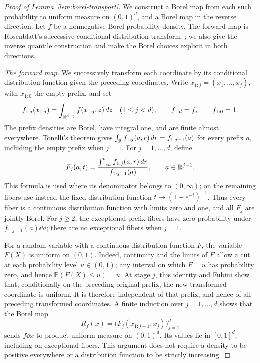 \begin{proof}[Proof of Lemma~\ref{lem:borel-transport}]
We construct a Borel map from each such probability to uniform measure
on \((0,1)^d\), and a Borel map in the reverse direction. Let \(f\) be a
nonnegative Borel probability density. The forward map is Rosenblatt's
successive conditional-distribution transform~\cite{Rosenblatt1952}; we
also give the inverse quantile construction and make the Borel choices
explicit in both directions.

\emph{The forward map.}
We successively transform each coordinate by its conditional distribution
function given the preceding coordinates. Write
\(x_{1:j}=(x_1,\ldots,x_j)\), with \(x_{1:0}\) the empty prefix, and set
\[
 f_{1:j}(x_{1:j})=\int_{\mathbb R^{d-j}}f(x_{1:j},z)\,d z
 \quad(1\le j<d),\qquad f_{1:d}=f,\qquad f_{1:0}=1.
\]
The prefix densities are Borel, have integral one, and are finite almost
everywhere. Tonelli's theorem gives
\(\int_\mathbb R f_{1:j}(a,r)\,d r=f_{1:j-1}(a)\) for every prefix \(a\),
including the empty prefix when \(j=1\). For \(j=1,\ldots,d\), define
\[
 F_j(a,t)=\frac{\int_{-\infty}^t f_{1:j}(a,r)\,d r}
                 {f_{1:j-1}(a)},\qquad a\in\mathbb R^{j-1}.
\]
This formula is used where its denominator belongs to \((0,\infty)\);
on the remaining fibers use instead the fixed distribution function
\(t\mapsto(1+e^{-t})^{-1}\). Thus every fiber is a continuous distribution
function with limits zero and one, and all \(F_j\) are jointly Borel.
For \(j\ge2\), the exceptional prefix fibers have zero probability under
\(f_{1:j-1}(a)\dd a\); there are no exceptional fibers when \(j=1\).

For a random variable with a continuous distribution function \(F\),
the variable \(F(X)\) is uniform on \((0,1)\). Indeed, continuity and the
limits of \(F\) allow a cut at each probability level \(u\in(0,1)\);
any interval on which \(F=u\) has probability zero, and hence
\(\mathbb P(F(X)\le u)=u\). At stage \(j\), this identity and Fubini show
that, conditionally on the preceding original prefix, the new transformed
coordinate is uniform.
It is therefore independent of that prefix, and hence of all preceding
transformed coordinates. A finite induction over \(j=1,\ldots,d\) shows that the Borel map
\[
 R_f(x)=\bigl(F_j(x_{1:j-1},x_j)\bigr)_{j=1}^d
\]
sends \(f\dd x\) to product uniform measure on \((0,1)^d\). Its values lie
in \([0,1]^d\), including on exceptional fibers. This argument does not
require a density to be positive everywhere or a distribution function to
be strictly increasing.


\end{proof}

